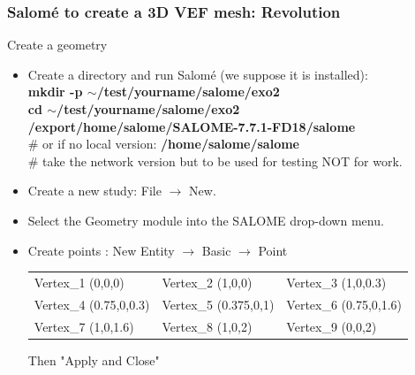 \documentclass[10pt]{beamer}
\begin{document}
\begin{frame}
\frametitle{Salom\'e to create a 3D VEF mesh: Revolution}
\begin{block}{Create a geometry}

\begin{itemize}
\item Create a directory and run Salom\'e (we suppose it is installed):\\
\textbf{mkdir -p $\sim$/test/yourname/salome/exo2} \\
\textbf{cd $\sim$/test/yourname/salome/exo2} \\

\textbf{/export/home/salome/SALOME-7.7.1-FD18/salome} \\
\# or if no local version: {\scriptsize{\textbf{/home/salome/salome}}} \\
\# take the network version but to be used for testing NOT for work.

\item Create a new study: File $\rightarrow$ New.

\item Select the Geometry module into the SALOME drop-down menu.

\item Create points : New Entity $\rightarrow$ Basic $\rightarrow$ Point\\
\begin{tabular}{lll}
Vertex\_1 (0,0,0)       &   Vertex\_2 (1,0,0)       &   Vertex\_3 (1,0,0.3) \tabularnewline
Vertex\_4 (0.75,0,0.3)  &   Vertex\_5 (0.375,0,1)   &   Vertex\_6 (0.75,0,1.6) \tabularnewline
Vertex\_7 (1,0,1.6)     &   Vertex\_8 (1,0,2)       &   Vertex\_9 (0,0,2) \tabularnewline
\end{tabular}

Then "Apply and Close"

\end{itemize}

\end{block}
\end{frame}
\end{document}
